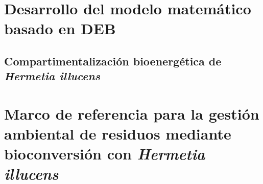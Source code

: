 \documentclass[10pt,spanish,fleqn,openany,twoside,letterpaper]{book}
\begin{document}
\chapter{Desarrollo del modelo matemático basado en DEB}

\section{Compartimentalización bioenergética de \textit{Hermetia illucens}}



%

%

%

%

%

\chapter[Marco de referencia]{Marco de referencia para la gestión ambiental de residuos mediante bioconversión con \textit{Hermetia illucens}}
\end{document}

